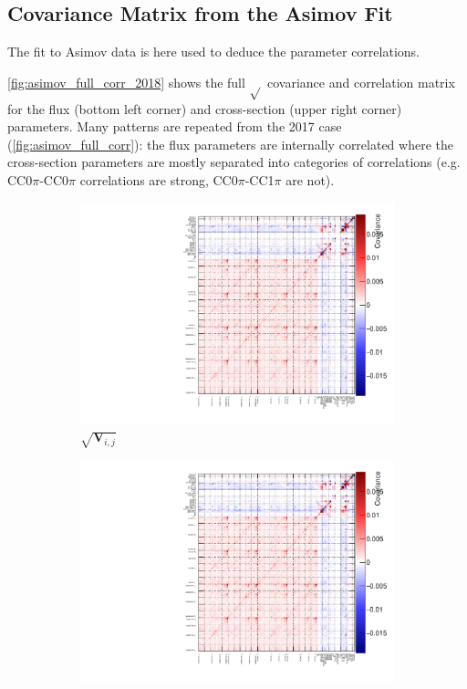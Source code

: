 \subsection{Covariance Matrix from the Asimov Fit}
The fit to Asimov data is here used to deduce the parameter correlations.

\autoref{fig:asimov_full_corr_2018} shows the full $\sqrt{}$ covariance and correlation matrix for the flux (bottom left corner) and cross-section (upper right corner) parameters. Many patterns are repeated from the 2017 case (\autoref{fig:asimov_full_corr}): the flux parameters are internally correlated where the cross-section parameters are mostly separated into categories of correlations (e.g. CC0$\pi$-CC0$\pi$ correlations are strong, CC0$\pi$-CC1$\pi$ are not).
\begin{figure}[h]
	\begin{subfigure}[t]{0.49\textwidth}
		\includegraphics[width=\textwidth, trim={0mm 0mm 0mm 0mm}, clip,page=2]{figures/mach3/2018/asimov/corr/2018a_MultiPi_Binningv6_NewCov_Asimov_merge_drawCorr}
		\caption{$\sqrt{\mathbf{V}_{i,j}}$}
	\end{subfigure}
	\begin{subfigure}[t]{0.49\textwidth}
		\includegraphics[width=\textwidth, trim={0mm 0mm 0mm 0mm}, clip,page=3]{figures/mach3/2018/asimov/corr/2018a_MultiPi_Binningv6_NewCov_Asimov_merge_drawCorr}

\end{subfigure}
\end{figure}
